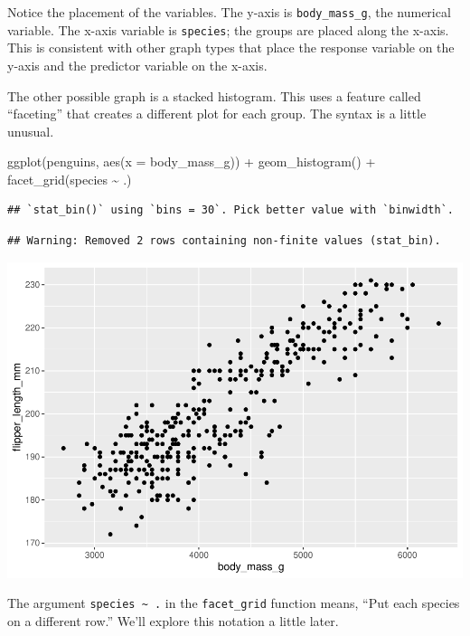 \documentclass[
]{book}
\newenvironment{Shaded}{\begin{snugshade}}{\end{snugshade}}
\newcommand{\AttributeTok}[1]{\textcolor[rgb]{0.77,0.63,0.00}{#1}}
\newcommand{\FunctionTok}[1]{\textcolor[rgb]{0.00,0.00,0.00}{#1}}
\newcommand{\NormalTok}[1]{#1}
\newcommand{\SpecialCharTok}[1]{\textcolor[rgb]{0.00,0.00,0.00}{#1}}
\begin{document}
Notice the placement of the variables. The y-axis is \texttt{body\_mass\_g}, the numerical variable. The x-axis variable is \texttt{species}; the groups are placed along the x-axis. This is consistent with other graph types that place the response variable on the y-axis and the predictor variable on the x-axis.

The other possible graph is a stacked histogram. This uses a feature called ``faceting'' that creates a different plot for each group. The syntax is a little unusual.

\begin{Shaded}
\begin{Highlighting}[]
\FunctionTok{ggplot}\NormalTok{(penguins, }\FunctionTok{aes}\NormalTok{(}\AttributeTok{x =}\NormalTok{ body\_mass\_g)) }\SpecialCharTok{+}
    \FunctionTok{geom\_histogram}\NormalTok{() }\SpecialCharTok{+}
    \FunctionTok{facet\_grid}\NormalTok{(species }\SpecialCharTok{\textasciitilde{}}\NormalTok{ .)}
\end{Highlighting}
\end{Shaded}

\begin{verbatim}
## `stat_bin()` using `bins = 30`. Pick better value with `binwidth`.
\end{verbatim}

\begin{verbatim}
## Warning: Removed 2 rows containing non-finite values (stat_bin).
\end{verbatim}

\includegraphics{intro_stats_files/figure-latex/unnamed-chunk-106-1.pdf}

The argument \texttt{species\ \textasciitilde{}\ .} in the \texttt{facet\_grid} function means, ``Put each species on a different row.'' We'll explore this notation a little later.
\end{document}
